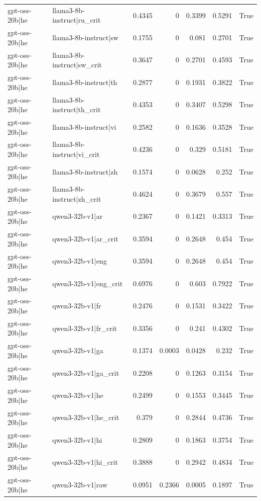 \begin{table}
\begin{tabular}{l l r r r r l}
gpt-oss-20b|he & llama3-8b-instruct|ru_crit & 0.4345 & 0 & 0.3399 & 0.5291 & True \\
gpt-oss-20b|he & llama3-8b-instruct|sw & 0.1755 & 0 & 0.081 & 0.2701 & True \\
gpt-oss-20b|he & llama3-8b-instruct|sw_crit & 0.3647 & 0 & 0.2701 & 0.4593 & True \\
gpt-oss-20b|he & llama3-8b-instruct|th & 0.2877 & 0 & 0.1931 & 0.3822 & True \\
gpt-oss-20b|he & llama3-8b-instruct|th_crit & 0.4353 & 0 & 0.3407 & 0.5298 & True \\
gpt-oss-20b|he & llama3-8b-instruct|vi & 0.2582 & 0 & 0.1636 & 0.3528 & True \\
gpt-oss-20b|he & llama3-8b-instruct|vi_crit & 0.4236 & 0 & 0.329 & 0.5181 & True \\
gpt-oss-20b|he & llama3-8b-instruct|zh & 0.1574 & 0 & 0.0628 & 0.252 & True \\
gpt-oss-20b|he & llama3-8b-instruct|zh_crit & 0.4624 & 0 & 0.3679 & 0.557 & True \\
gpt-oss-20b|he & qwen3-32b-v1|ar & 0.2367 & 0 & 0.1421 & 0.3313 & True \\
gpt-oss-20b|he & qwen3-32b-v1|ar_crit & 0.3594 & 0 & 0.2648 & 0.454 & True \\
gpt-oss-20b|he & qwen3-32b-v1|eng & 0.3594 & 0 & 0.2648 & 0.454 & True \\
gpt-oss-20b|he & qwen3-32b-v1|eng_crit & 0.6976 & 0 & 0.603 & 0.7922 & True \\
gpt-oss-20b|he & qwen3-32b-v1|fr & 0.2476 & 0 & 0.1531 & 0.3422 & True \\
gpt-oss-20b|he & qwen3-32b-v1|fr_crit & 0.3356 & 0 & 0.241 & 0.4302 & True \\
gpt-oss-20b|he & qwen3-32b-v1|ga & 0.1374 & 0.0003 & 0.0428 & 0.232 & True \\
gpt-oss-20b|he & qwen3-32b-v1|ga_crit & 0.2208 & 0 & 0.1263 & 0.3154 & True \\
gpt-oss-20b|he & qwen3-32b-v1|he & 0.2499 & 0 & 0.1553 & 0.3445 & True \\
gpt-oss-20b|he & qwen3-32b-v1|he_crit & 0.379 & 0 & 0.2844 & 0.4736 & True \\
gpt-oss-20b|he & qwen3-32b-v1|hi & 0.2809 & 0 & 0.1863 & 0.3754 & True \\
gpt-oss-20b|he & qwen3-32b-v1|hi_crit & 0.3888 & 0 & 0.2942 & 0.4834 & True \\
gpt-oss-20b|he & qwen3-32b-v1|raw & 0.0951 & 0.2366 & 0.0005 & 0.1897 & True \\

\end{tabular}
\end{table}
